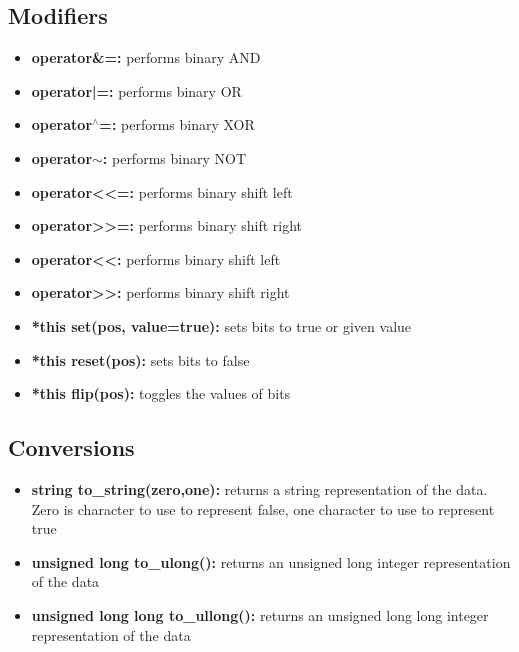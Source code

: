 \documentclass{report}
\begin{document}
        \subsection{Modifiers}
        \begin{itemize}
            \item \textbf{operator\&=:} performs binary AND
            \item \textbf{operator|=:} performs binary OR
            \item \textbf{operator$^{\land}$=:} performs binary XOR
            \item \textbf{operator$\sim$:} performs binary NOT
            \item \textbf{operator<<=:} performs binary shift left
            \item \textbf{operator>>=:} performs binary shift right
            \item \textbf{operator<<:} performs binary shift left
            \item \textbf{operator>>:} performs binary shift right
            \item \textbf{*this set(pos, value=true):} sets bits to true or given value
            \item \textbf{*this reset(pos):} sets bits to false
            \item \textbf{*this flip(pos):} toggles the values of bits
        \end{itemize}

        \bigbreak \noindent 
        \subsection{Conversions}
        \begin{itemize}
            \item \textbf{string to\_string(zero,one):} returns a string representation of the data. Zero is character to use to represent false, one character to use to represent true
            \item \textbf{unsigned long to\_ulong():} returns an unsigned long integer representation of the data
            \item \textbf{unsigned long long to\_ullong():} returns an unsigned long long integer representation of the data
        \end{itemize}

        \pagebreak 
        \bigbreak \noindent 
\end{document}
